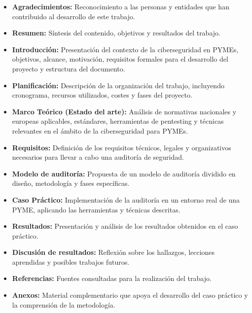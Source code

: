 \documentclass[a4paper, 10pt]{article}
\begin{document}
\begin{itemize}
    \item \textbf{Agradecimientos:} Reconocimiento a las personas y entidades que han contribuido al desarrollo de este trabajo.
    
    \item \textbf{Resumen:} Síntesis del contenido, objetivos y resultados del trabajo.
    
    \item \textbf{Introducción:} Presentación del contexto de la ciberseguridad en PYMEs, objetivos, alcance, motivación, requisitos formales para el desarrollo del proyecto y estructura del documento.
    
    \item \textbf{Planificación:} Descripción de la organización del trabajo, incluyendo cronograma, recursos utilizados, costes y fases del proyecto.
    
    \item \textbf{Marco Teórico (Estado del arte):} Análisis de normativas nacionales y europeas aplicables, estándares, herramientas de pentesting y técnicas relevantes en el ámbito de la ciberseguridad para PYMEs.
    
    \item \textbf{Requisitos:} Definición de los requisitos técnicos, legales y organizativos necesarios para llevar a cabo una auditoría de seguridad.
    
    \item \textbf{Modelo de auditoría:} Propuesta de un modelo de auditoría dividido en diseño, metodología y fases específicas.
    
    \item \textbf{Caso Práctico:} Implementación de la auditoría en un entorno real de una PYME, aplicando las herramientas y técnicas descritas.
    
    \item \textbf{Resultados:} Presentación y análisis de los resultados obtenidos en el caso práctico.
    
    \item \textbf{Discusión de resultados:} Reflexión sobre los hallazgos, lecciones aprendidas y posibles trabajos futuros.
    
    \item \textbf{Referencias:} Fuentes consultadas para la realización del trabajo.
    
    \item \textbf{Anexos:}  Material complementario que apoya el desarrollo del caso práctico y la comprensión de la metodología.

\end{itemize}
\end{document}
